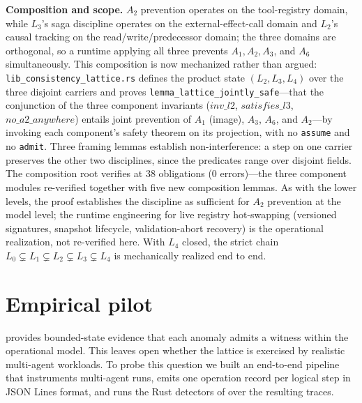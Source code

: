 \documentclass[journal,compsoc,10pt]{IEEEtran}
\theoremstyle{definition}
\theoremstyle{remark}
\begin{document}
\medskip
\noindent\textbf{Composition and scope.}
$A_2$ prevention operates on the tool-registry domain, while
$L_3$'s saga discipline operates on the external-effect-call
domain and $L_2$'s causal tracking on the
read/write/predecessor domain; the three domains are
orthogonal, so a runtime applying all three prevents
$A_1, A_2, A_3$, and $A_6$ simultaneously. This composition is now mechanized rather than argued: \texttt{lib\_consistency\_lattice.rs} defines the product state $(L_2, L_3, L_4)$ over the three disjoint carriers and proves \texttt{lemma\_lattice\_jointly\_safe}---that the conjunction of the three component invariants ($\mathit{inv\_l2}$, $\mathit{satisfies\_l3}$, $\mathit{no\_a2\_anywhere}$) entails joint prevention of $A_1$ (image), $A_3$, $A_6$, and $A_2$---by invoking each component's safety theorem on its projection, with no \texttt{assume} and no \texttt{admit}. Three framing lemmas establish non-interference: a step on one carrier preserves the other two disciplines, since the predicates range over disjoint fields. The composition root verifies at 38 obligations (0 errors)---the three component modules re-verified together with five new composition lemmas. As with the lower
levels, the proof establishes the discipline as sufficient for
$A_2$ prevention at the model level; the runtime engineering
for live registry hot-swapping (versioned signatures,
snapshot lifecycle, validation-abort recovery) is the
operational realization, not re-verified here. With $L_4$
closed, the strict chain
$L_0 \subsetneq L_1 \subsetneq L_2 \subsetneq L_3 \subsetneq L_4$
is mechanically realized end to end.

\section{Empirical pilot}
\label{sec:empirical}

 provides bounded-state evidence that each
anomaly admits a witness within the operational model. This leaves
open whether the lattice is exercised by realistic multi-agent
workloads. To probe this question we built an end-to-end pipeline
that instruments multi-agent runs, emits one operation record per
logical step in JSON Lines format, and runs the Rust detectors of
 over the resulting traces.
\end{document}
